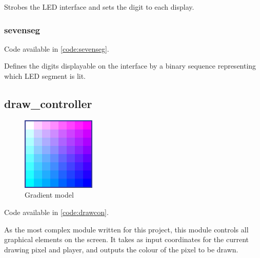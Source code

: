 Strobes the LED interface and sets the digit to each display. 

\subsubsection{sevenseg}
Code available in \cref{code:sevenseg}.

Defines the digits displayable on the interface by a binary sequence representing which LED segment is lit. 

\subsection{draw\_controller}\label{sec:drawcon}
\begin{figure}
    \centering
    \includegraphics[width=0.9\linewidth]{figures/gradient.png}
    \caption{Gradient model}\label{fig:gradient}
\end{figure}
Code available in \cref{code:drawcon}.

As the most complex module written for this project, this module controls all graphical elements on the screen. 
It takes as input coordinates for the current drawing pixel and player, and outputs the colour of the pixel 
to be drawn. 

